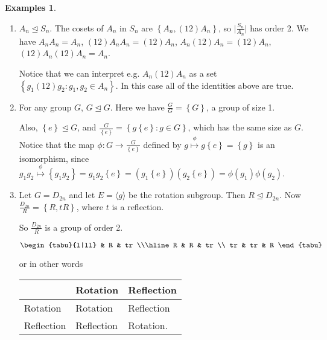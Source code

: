 \documentclass{article}
\theoremstyle{definition}
\newtheorem*{exmps}{Examples}
\newcommand{\gene}[1]{\langle #1 \rangle}
\begin{document}
\begin{exmps}\hfill
  \begin{enumerate}
     \item $A_n \trianglelefteq S_n$. The cosets of $A_n$ in $S_n$ are $\left\{ A_n , (12)A_n\right\}$, so
      $\big|\frac{S_n}{A_n}\big|$ has order 2. We have
      $A_nA_n = A_n$, $(12)A_nA_n=(12)A_n$, $A_n(12)A_n=(12)A_n$, $(12)A_n(12)A_n=A_n$.

      Notice that we can interpret e.g. $A_n(12)A_n$ as a set $\left\{ g_1(12)g_2 : g_1,g_2 \in A_n \right\}$. In this case all of the identities above are true.

    \item For any group $G$, $G \trianglelefteq G$. Here we have $\frac{G}{G}=\left\{ G \right\}$, a group of size 1.

      Also, $\left\{ e \right\} \trianglelefteq G$, and $\frac{G}{\left\{ e \right\}}=\left\{ g\left\{ e \right\}:g \in G \right\}$, which has the same size as $G$. Notice that the map $\phi : G \rightarrow \frac{G}{\left\{ e \right\}}$ defined by $g \overset{\phi}{\mapsto} g\left\{ e \right\}=\left\{ g \right\}$ is an isomorphism, since $g_1g_2 \overset{\phi}{\mapsto} \left\{ g_1g_2 \right\}=g_1g_2\left\{ e \right\}=(g_1\left\{ e \right\})(g_2\left\{ e \right\})=\phi(g_1)\phi(g_2)$. 


\newpage
    \item Let $G=D_{2n}$ and let $E = \gene{g}$ be the rotation subgroup. Then $R \trianglelefteq D_{2n}$. Now $\frac{D_{2n}}{R}=\left\{ R,tR \right\}$, where $t$ is a reflection.

      So $\frac{D_{2n}}{R}$ is a group of order 2.

      \begin{table}[h]
        \centering
        $\begin{tabu}{l|ll}
          & R & tr \\\hline
        R & R & tr \\
        tr & tr & R
        \end{tabu}$
        \label{tab:d2ntable}
      \end{table}
      or in other words

      \begin{table}[h]
        \centering
        \begin{tabular}{l|ll}
          & Rotation & Reflection\\\hline
          Rotation & Rotation & Reflection\\
          Reflection & Reflection & Rotation.
        \end{tabular}
        \label{tab:rottable}
       \end{table}


\end{enumerate}
\end{exmps}
\end{document}
